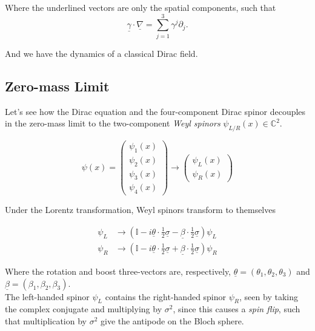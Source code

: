 \noindent Where the underlined vectors are only the spatial components, such that 
$$\underline{\gamma} \cdot \underline{\nabla}  = \sum_{j=1}^3 \gamma^j \partial_j.$$

\noindent And we have the dynamics of a classical Dirac field.

\subsection*{Zero-mass Limit}

\noindent Let's see how the Dirac equation and the four-component Dirac spinor decouples in the zero-mass limit to the two-component \textit{Weyl spinors} $\psi_{L/R}(x) \in \mathbb{C}^2$.

\begin{equation}
\psi(x) = \left( \begin{array}{c} \psi_1(x) \\ \psi_2(x) \\ \psi_3(x) \\ \psi_4(x) \end{array} \right) \rightarrow \left( \begin{array}{c}\psi_L(x) \\ \psi_R(x) \end{array} \right)
\end{equation}

\noindent Under the Lorentz transformation, Weyl spinors transform to themselves

\begin{align}
\psi_L &\rightarrow (\mathbb{I} - i \underline{\theta} \cdot \frac{1}{2} \underline{\sigma} - \underline{\beta} \cdot \frac{1}{2} \underline{\sigma} ) \psi_L \\
\psi_R &\rightarrow(\mathbb{I} - i \underline{\theta} \cdot \frac{1}{2} \underline{\sigma} + \underline{\beta} \cdot \frac{1}{2} \underline{\sigma} ) \psi_R
\end{align}

\noindent Where the rotation and boost three-vectors are, respectively, $\underline{\theta} = (\theta_1,\theta_2,\theta_3)$ and $\underline{\beta} = (\beta_1,\beta_2,\beta_3)$. \\

\noindent The left-handed spinor $\psi_L$ contains the right-handed spinor $\psi_R$, seen by taking the complex conjugate and multiplying by $\sigma^2$, since this causes a \textit{spin flip}, such that multiplication by $\sigma^2$ give the antipode on the Bloch sphere.

